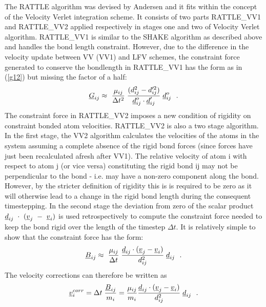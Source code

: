 The RATTLE algorithm  was devised by
Andersen \cite{andersen-83a} and it fits within the concept of the
Velocity Verlet integration scheme.  It
consists of two parts RATTLE\_VV1 and RATTLE\_VV2 applied
respectively in stages one and two of Velocity
Verlet algorithm.  RATTLE\_VV1 is similar to
the SHAKE algorithm as described above and handles the bond length
constraint.  However, due to the difference in the velocity update
between VV (VV1) and LFV schemes, the constraint force generated to
conserve the bondlength in RATTLE\_VV1 has the form as in
(\ref{g12}) but missing the factor of a half:
\begin{equation}
\mbox{$\underline{G}$}_{ij} \approx\ {\mu_{ij} \over \Delta t^{2}} \;
{(d_{ij}^{2} - d_{ij}'^{2}) \over \mbox{$\underline{d}$}_{ij}^{o} \cdot
\mbox{$\underline{d}$}_{ij}'} \; \mbox{$\underline{d}$}_{ij}^{o}~~. \label{g121}
\end{equation}
The constraint force in RATTLE\_VV2 imposes a new condition of
rigidity on constraint bonded atom velocities.  RATTLE\_VV2 is
also a two stage algorithm.  In the first stage, the VV2 algorithm
calculates the velocities of the atoms in the system assuming a
complete absence of the rigid bond
forces (since forces have just been recalculated afresh after VV1).
The relative velocity of atom {i} with respect to atom {j}
(or vice versa) constituting the rigid bond {ij} may not be
perpendicular to the bond -  i.e. may have a non-zero component
along the bond. However, by the stricter definition of rigidity
this is is required to be zero as it will otherwise lead to a
change in the rigid bond length during the consequent timestepping.
In the second stage the deviation from zero of the scalar product
$\mbox{$\underline{d}$}_{ij}~\cdot~(\mbox{$\underline{v}$}_{j}~-~\mbox{$\underline{v}$}_{i})$ is used
retrospectively to compute the constraint force needed to keep the
bond rigid over the length of the timestep $\Delta t$.  It is
relatively simple to show that the constraint force has the form:
\begin{equation}
\mbox{$\underline{B}$}_{ij} \approx\ {\mu_{ij} \over \Delta t} \;
{\mbox{$\underline{d}$}_{ij} \cdot (\mbox{$\underline{v}$}_{j}-\mbox{$\underline{v}$}_{i}) \over
d_{ij}^{2}} \; \mbox{$\underline{d}$}_{ij}~~. \label{b12}
\end{equation}
The velocity corrections can therefore be written as
\begin{equation}
\mbox{$\underline{v}$}^{corr}_{i} = \Delta t \; {\mbox{$\underline{B}$}_{ij} \over m_{i}} =
{\mu_{ij} \over m_{i}} {\mbox{$\underline{d}$}_{ij} \cdot (\mbox{$\underline{v}$}_{j}-\mbox{$\underline{v}$}_{i}) \over
d_{ij}^{2}} \; \mbox{$\underline{d}$}_{ij}~~.
\end{equation}


